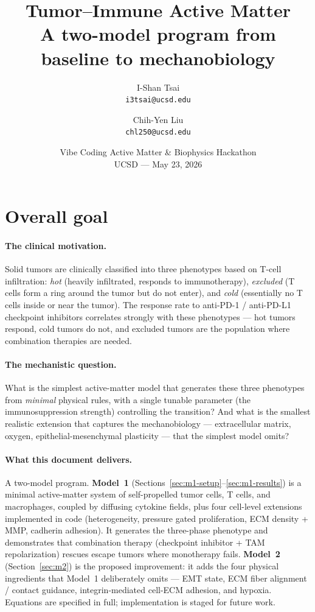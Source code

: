 \documentclass[11pt,letterpaper]{article}
\title{\textbf{Tumor--Immune Active Matter}\\
       \large A two-model program from baseline to mechanobiology}
\author{
  I-Shan Tsai \\
  {\small \texttt{i3tsai@ucsd.edu}}
  \and
  Chih-Yen Liu \\
  {\small \texttt{chl250@ucsd.edu}}
}
\date{Vibe Coding Active Matter \& Biophysics Hackathon \\ UCSD --- May 23, 2026}
\begin{document}
\maketitle

\tableofcontents
\bigskip

\section{Overall goal}

\paragraph{The clinical motivation.}
Solid tumors are clinically classified into three phenotypes based on
T-cell infiltration: \emph{hot} (heavily infiltrated, responds to
immunotherapy), \emph{excluded} (T cells form a ring around the tumor but
do not enter), and \emph{cold} (essentially no T cells inside or near the
tumor). The response rate to anti-PD-1 / anti-PD-L1 checkpoint inhibitors
correlates strongly with these phenotypes --- hot tumors respond, cold
tumors do not, and excluded tumors are the population where combination
therapies are needed.

\paragraph{The mechanistic question.}
What is the simplest active-matter model that generates these three
phenotypes from \emph{minimal} physical rules, with a single tunable
parameter (the immunosuppression strength) controlling the transition?
And what is the smallest realistic extension that captures the
mechanobiology --- extracellular matrix, oxygen, epithelial-mesenchymal
plasticity --- that the simplest model omits?

\paragraph{What this document delivers.}
A two-model program. \textbf{Model~1} (Sections~\ref{sec:m1-setup}--\ref{sec:m1-results})
is a minimal active-matter system of self-propelled tumor cells,
T cells, and macrophages, coupled by diffusing cytokine fields, plus
four cell-level extensions implemented in code (heterogeneity, pressure
gated proliferation, ECM density + MMP, cadherin adhesion). It
generates the three-phase phenotype and demonstrates that combination
therapy (checkpoint inhibitor + TAM repolarization) rescues escape
tumors where monotherapy fails. \textbf{Model~2}
(Section~\ref{sec:m2}) is the proposed improvement: it adds the
four physical ingredients that Model~1 deliberately omits --- EMT
state, ECM fiber alignment / contact guidance, integrin-mediated
cell-ECM adhesion, and hypoxia. Equations are specified in full;
implementation is staged for future work.
\end{document}
